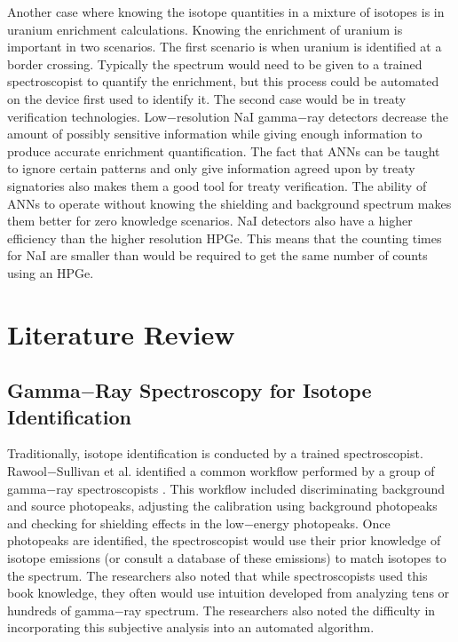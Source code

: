 \documentclass[tocnosub,noragright,centerchapter,12pt,fullpage]{uiucecethesis09}
\begin{document}
Another case where knowing the isotope quantities in a mixture of isotopes is in uranium enrichment calculations. Knowing the enrichment of uranium is important in two scenarios. The first scenario is when uranium is identified at a border crossing. Typically the spectrum would need to be given to a trained spectroscopist to quantify the enrichment, but this process could be automated on the device first used to identify it. The second case would be in treaty verification technologies. Low$-$resolution NaI gamma$-$ray detectors decrease the amount of possibly sensitive information while giving enough information to produce accurate enrichment quantification. The fact that ANNs can be taught to ignore certain patterns and only give information agreed upon by treaty signatories also makes them a good tool for treaty verification. The ability of ANNs to operate without knowing the shielding and background spectrum makes them better for zero knowledge scenarios. NaI detectors also have a higher efficiency than the higher resolution HPGe. This means that the counting times for NaI are smaller than would be required to get the same number of counts using an HPGe. 














\chapter{Literature Review}


\section{Gamma$-$Ray Spectroscopy for Isotope Identification}

Traditionally, isotope identification is conducted by a trained spectroscopist. Rawool$-$Sullivan et al. identified a common workflow performed by a group of gamma$-$ray spectroscopists \cite{Sullivan2010}. This workflow included discriminating background and source photopeaks, adjusting the calibration using background photopeaks and checking for shielding effects in the low$-$energy photopeaks. Once photopeaks are identified, the spectroscopist would use their prior knowledge of isotope emissions (or consult a database of these emissions) to match isotopes to the spectrum. The researchers also noted that while  spectroscopists used this book knowledge, they often would use intuition developed from analyzing tens or hundreds of gamma$-$ray spectrum. The researchers also noted the difficulty in incorporating this subjective analysis into an automated algorithm.
\end{document}
